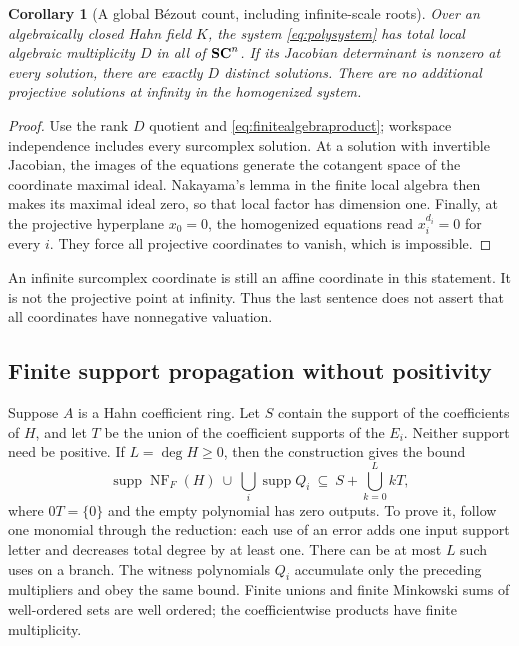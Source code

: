 \documentclass[11pt,letterpaper,oneside]{article}
\numberwithin{equation}{section}
\newtheorem{corollary}[theorem]{Corollary}
\theoremstyle{definition}
\theoremstyle{remark}\newtheorem{remark}[theorem]{Remark}
\newcommand{\supp}{\operatorname{supp}}\newcommand{\st}{\operatorname{st}}
\newcommand{\NF}{\operatorname{NF}}\newcommand{\Tr}{\operatorname{Tr}}
\begin{document}
\begin{corollary}[A global B\'ezout count, including infinite-scale roots]\label{cor:globalbezout}
Over an algebraically closed Hahn field $K$, the system
\eqref{eq:polysystem} has total local algebraic multiplicity $D$ in
all of $\mathbf{SC}^n$. If its Jacobian determinant is nonzero at every solution,
there are exactly $D$ distinct solutions. There are no additional
projective solutions at infinity in the homogenized system.
\end{corollary}
\begin{proof}
Use the rank $D$ quotient and \eqref{eq:finitealgebraproduct}; workspace
independence includes every surcomplex solution. At a solution with
invertible Jacobian, the images of the equations generate the cotangent
space of the coordinate maximal ideal. Nakayama's lemma in the finite
local algebra then makes its maximal ideal zero, so that local factor
has dimension one. Finally, at the projective hyperplane $x_0=0$, the
homogenized equations read $x_i^{d_i}=0$ for every $i$. They force all
projective coordinates to vanish, which is impossible.
\end{proof}
An infinite surcomplex coordinate is still an affine coordinate in this
statement. It is not the projective point at infinity. Thus the last
sentence does not assert that all coordinates have nonnegative valuation.

\subsection{Finite support propagation without positivity}
Suppose $A$ is a Hahn coefficient ring. Let $S$ contain the support of the
coefficients of $H$, and let $T$ be the union of the coefficient supports
of the $E_i$. Neither support need be positive. If $L=\deg H\geq0$,
then the construction gives the bound
\begin{equation}\label{eq:finitepolysupport}
 \supp\NF_F(H)\ \cup\ \bigcup_i\supp Q_i
 \ \subseteq\ S+\bigcup_{k=0}^{L}kT,
\end{equation}
where $0T=\{0\}$ and the empty polynomial has zero outputs. To prove it,
follow one monomial through the reduction: each use of an error adds
one input support letter and decreases total degree by at least one.
There can be at most $L$ such uses on a branch. The witness polynomials
$Q_i$ accumulate only the preceding multipliers and obey the same bound.
Finite unions and finite Minkowski sums of well-ordered sets are well
ordered; the coefficientwise products have finite multiplicity.
\end{document}

